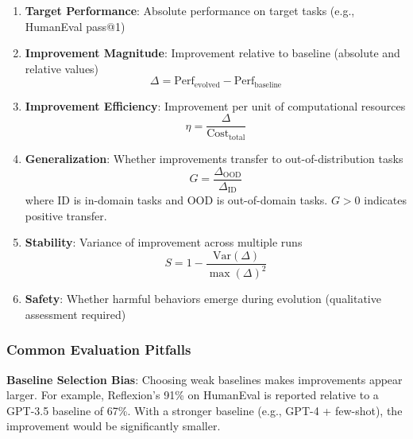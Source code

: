 \begin{enumerate}
\item \textbf{Target Performance}: Absolute performance on target tasks (e.g., HumanEval pass@1)

\item \textbf{Improvement Magnitude}: Improvement relative to baseline (absolute and relative values)
\begin{equation}
\Delta = \text{Perf}_{\mathrm{evolved}} - \text{Perf}_{\mathrm{baseline}}
\label{eq:improvement-delta}
\end{equation}

\item \textbf{Improvement Efficiency}: Improvement per unit of computational resources
\begin{equation}
\eta = \frac{\Delta}{\text{Cost}_{\mathrm{total}}}
\label{eq:improvement-efficiency}
\end{equation}

\item \textbf{Generalization}: Whether improvements transfer to out-of-distribution tasks
\begin{equation}
G = \frac{\Delta_{\mathrm{OOD}}}{\Delta_{\mathrm{ID}}}
\label{eq:generalization-ratio}
\end{equation}
where ID is in-domain tasks and OOD is out-of-domain tasks. $G > 0$ indicates positive transfer.

\item \textbf{Stability}: Variance of improvement across multiple runs
\begin{equation}
S = 1 - \frac{\mathrm{Var}(\Delta)}{\max(\Delta)^2}
\label{eq:stability}
\end{equation}

\item \textbf{Safety}: Whether harmful behaviors emerge during evolution (qualitative assessment required)
\end{enumerate}

\subsubsection{Common Evaluation Pitfalls}

\textbf{Baseline Selection Bias}: Choosing weak baselines makes improvements appear larger. For example, Reflexion's 91\% on HumanEval is reported relative to a GPT-3.5 baseline of 67\%. With a stronger baseline (e.g., GPT-4 + few-shot), the improvement would be significantly smaller.

